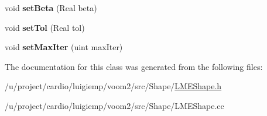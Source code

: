 \begin{DoxyCompactItemize}
\item 
\hypertarget{classvoom_1_1_l_m_e_shape_a9cc76717eaf84d2bbd1a738ef675a768}{
void {\bfseries setBeta} (Real beta)}
\label{classvoom_1_1_l_m_e_shape_a9cc76717eaf84d2bbd1a738ef675a768}

\item 
\hypertarget{classvoom_1_1_l_m_e_shape_a57640a3f7493096c0afdfaab0e5279e1}{
void {\bfseries setTol} (Real tol)}
\label{classvoom_1_1_l_m_e_shape_a57640a3f7493096c0afdfaab0e5279e1}

\item 
\hypertarget{classvoom_1_1_l_m_e_shape_ac710c43a96fb4e9cb77c308d87bf0ce0}{
void {\bfseries setMaxIter} (uint maxIter)}
\label{classvoom_1_1_l_m_e_shape_ac710c43a96fb4e9cb77c308d87bf0ce0}

\end{DoxyCompactItemize}


The documentation for this class was generated from the following files:\begin{DoxyCompactItemize}
\item 
/u/project/cardio/luigiemp/voom2/src/Shape/\hyperlink{_l_m_e_shape_8h}{LMEShape.h}\item 
/u/project/cardio/luigiemp/voom2/src/Shape/LMEShape.cc\end{DoxyCompactItemize}
